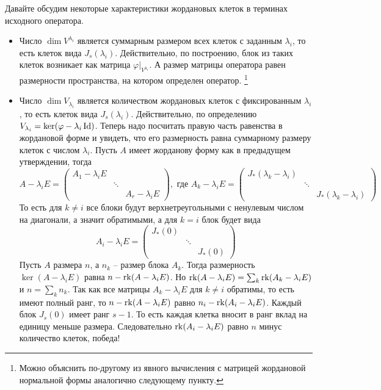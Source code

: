 Давайте обсудим некоторые характеристики жордановых клеток в терминах исходного оператора.
\begin{itemize}
\item Число $\dim V^{\lambda_i}$ является суммарным размером всех клеток с заданным $\lambda_i$, то есть клеток вида $J_s(\lambda_i)$.
Действительно, по построению, блок из таких клеток возникает как матрица $\varphi|_{V^{\lambda_i}}$.
А размер матрицы оператора равен размерности пространства, на котором определен оператор.%
%
\footnote{Можно объяснить по-другому из явного вычисления с матрицей жордановой нормальной формы аналогично следующему пункту.}

\item Число $\dim V_{\lambda_i}$ является количеством жордановых клеток с фиксированным $\lambda_i$, то есть клеток вида $J_s(\lambda_i)$.
Действительно, по определению $V_{\lambda_i} = \ker (\varphi - \lambda_i \operatorname{Id})$.
Теперь надо посчитать правую часть равенства в жордановой форме и увидеть, что его размерность равна суммарному размеру клеток с числом $\lambda_i$.
Пусть $A$ имеет жорданову форму как в предыдущем утверждении, тогда
\[
A -\lambda_i E= 
\begin{pmatrix}
{A_1-\lambda_i E}&{}&{}\\
{}&{\ddots}&{}\\
{}&{}&{A_r - \lambda_i E}
\end{pmatrix},\text{ где }
A_k -\lambda_i E=
\begin{pmatrix}
{J_*(\lambda_k - \lambda_i)}&{}&{}\\
{}&{\ddots}&{}\\
{}&{}&{J_*(\lambda_k - \lambda_i)}
\end{pmatrix}
\]
То есть для $k\neq i$ все блоки будут верхнетреугольными с ненулевым числом на диагонали, а значит обратимыми, а для $k = i$ блок будет вида
\[
A_i -\lambda_i E=
\begin{pmatrix}
{J_*(0)}&{}&{}\\
{}&{\ddots}&{}\\
{}&{}&{J_*(0)}
\end{pmatrix}
\]
Пусть $A$ размера $n$, а $n_k$ -- размер блока $A_k$.
Тогда размерность $\ker (A - \lambda_i E)$ равна $n - \operatorname{rk} (A - \lambda_i E)$.
Но $\operatorname{rk} (A - \lambda_i E) = \sum_k \operatorname{rk} (A_k - \lambda_i E)$ и $n = \sum_k n_k$.
Так как все матрицы $A_k - \lambda_i E$ для $k\neq i$ обратимы, то есть имеют полный ранг, то $n - \operatorname{rk} (A-\lambda_i E)$ равно $n_i - \operatorname{rk} (A_i - \lambda_iE)$.
Каждый блок $J_s(0)$ имеет ранг $s-1$.
То есть каждая клетка вносит в ранг вклад на единицу меньше размера.
Следовательно $\operatorname{rk}(A_i -\lambda_i E)$ равно $n$ минус количество клеток, победа!


\end{itemize}
